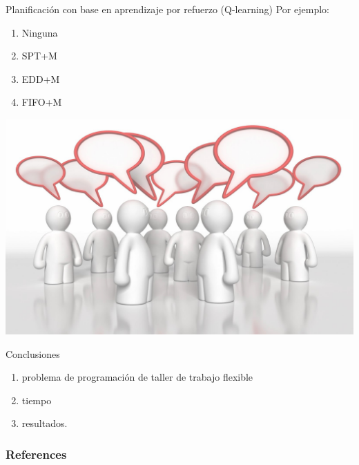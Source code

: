 \documentclass{beamer}
\newcommand{\fjssp}{problema de programación de taller de trabajo flexible}
\begin{document}
\begin{frame}{Planificación con base en aprendizaje por refuerzo (Q-learning)}
Por ejemplo:
\setlength{\leftmargini}{60 pt}
\begin{enumerate}
	\item Ninguna
	\item SPT+M
	\item EDD+M
	\item FIFO+M
\end{enumerate}	
\end{frame}


{
{
    \includegraphics[width=\paperwidth,height=\paperheight]{discussion.jpg}
}
\begin{frame}{Conclusiones}
\begin{enumerate}
	\item \fjssp
	\item tiempo
	\item resultados.
\end{enumerate}

\end{frame}
}

\begin{frame}[allowframebreaks] %
	\frametitle{References}
	
	
	
\end{frame}
\end{document}
